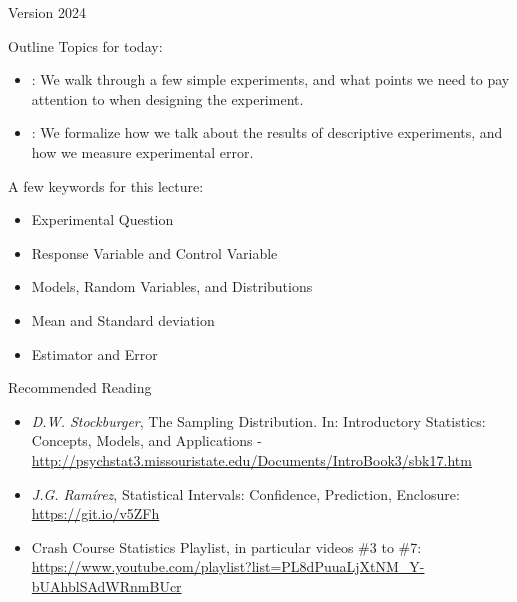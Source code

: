 \documentclass[aspectratio=169]{beamer}
\subtitle[Statistical Indicators]{Topic 02 - Descriptive Experiments, Point and Interval Indicators}
\begin{document}

\begin{frame}
  \maketitle

  \vfill

  \hfill \tiny{Version 2024}
\end{frame}

\begin{frame}[t]{Outline}
  Topics for today:
  \begin{itemize}
    \item {}: We walk through a few simple experiments, and what points we need to pay attention to when designing the experiment.
    \item {}: We formalize how we talk about the results of descriptive experiments, and how we measure experimental error.
  \end{itemize}

  \bigskip
  A few keywords for this lecture:
  \begin{itemize}
    \item Experimental Question
    \item Response Variable and Control Variable
    \item Models, Random Variables, and Distributions
    \item Mean and Standard deviation
    \item Estimator and Error
  \end{itemize}
  
\end{frame}



%
%



\begin{frame}{Recommended Reading}
  \begin{itemize}
    \item \emph{D.W. Stockburger}, The Sampling Distribution. In: Introductory Statistics: Concepts, Models, and Applications -
    \url{http://psychstat3.missouristate.edu/Documents/IntroBook3/sbk17.htm}
    \item \emph{J.G. Ramírez}, Statistical Intervals: Confidence, Prediction, Enclosure: \url{https://git.io/v5ZFh}
    \item Crash Course Statistics Playlist, in particular videos \#3 to \#7: \url{https://www.youtube.com/playlist?list=PL8dPuuaLjXtNM_Y-bUAhblSAdWRnmBUcr}
  \end{itemize}
\end{frame}


\end{document}
